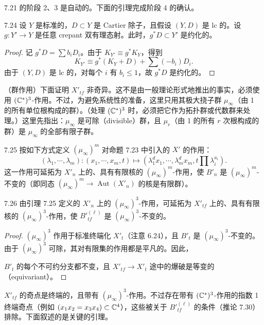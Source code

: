 7.21 的阶段 2、3 是自动的。下面的引理完成阶段 4 的确认。

\begin{lemmap}{7.24}
设 $Y$ 是标准的，$D\subset Y$ 是 Cartier 除子，且假设 $(Y,D)$ 是 lc 的。设 $g\colon Y'\to Y$ 是任意 crepant 双有理态射。此时，$g^*D\subset Y'$ 是约化的。
\end{lemmap}

\begin{proof}
记 $g^*D=\sum b_iD_i$。由于 $K_{Y'}\equiv g^*K_Y$，得到
\[
K_{Y'}\equiv g^*(K_Y+D)+\sum(-b_i)D_i.
\]
由于 $(Y,D)$ 是 lc 的，对每个 $i$ 有 $b_i\le1$，故 $g^*D$ 是约化的。
\end{proof}

（群作用）下面证明 $X'_{tf}$ 非奇异。这不是由一般理论形式地推出的事实，必须使用 $(\mathbb{C}^*)^3$-作用。不过，为避免系统性的准备，这里只用其极大挠子群 $\mu_\infty$（由 1 的所有单位根构成的群）。（处理 $(\mathbb{C}^*)^3$ 时，必须把它作为拓扑群或代数群来处理。）这里先指出：$\mu_\infty$ 是可除（divisible）群，且 $\mu_r$（由 1 的所有 $r$ 次根构成的群）是 $\mu_\infty$ 的全部有限子群。

\begin{lemma}{7.25}
按如下方式定义 $(\mu_\infty)^m$ 对命题 7.23 中引入的 $X'$ 的作用：
\[
(\lambda_1,\cdots,\lambda_m)\colon(x_1,\cdots,x_m,t)\mapsto(\lambda_1^dx_1,\cdots,\lambda_m^dx_m,t\prod\lambda_i^{a_i}).
\]
这一作用可延拓为 $X'_n$ 上的、具有有限核的 $(\mu_\infty)^m$-作用，使 $B'_n$ 是 $(\mu_\infty)^m$-不变的（即同态 $(\mu_\infty)^m\to\operatorname{Aut}(X'_n)$ 的核是有限群）。
\end{lemma}

\begin{corollaryp}{7.26}
由引理 7.25 定义的 $X'_n$ 上的 $(\mu_\infty)^3$-作用，可延拓为 $X'_{tf}$ 上的、具有有限核的 $(\mu_\infty)^3$-作用，使 $B'^{(\ell)}_{tf}$ 是 $(\mu_\infty)^3$-不变的。
\end{corollaryp}

\begin{proof}
$(\mu_\infty)^3$ 作用于标准终端化 $X'_t$（注意 6.24），且 $B'_t$ 是 $(\mu_\infty)^3$-不变的。由于 $(\mu_\infty)^3$ 可除，其对有限集的作用都是平凡的。因此，

$B'_t$ 的每个不可约分支都不变，且 $X'_{tf}\to X'_t$ 途中的爆破是等变的（equivariant）。
\end{proof}

$X'_{tf}$ 的奇点是终端的，且带有 $(\mu_\infty)^3$-作用。不过存在带有 $(\mathbb{C}^*)^3$-作用的指数 1 终端奇点（例如 $(x_1x_2=x_3x_4)\subset\mathbb{C}^4$），这些被关于 $B'^{(\ell)}_{tf}$ 的条件（推论 7.30）排除。下面叙述的是关键的引理。

